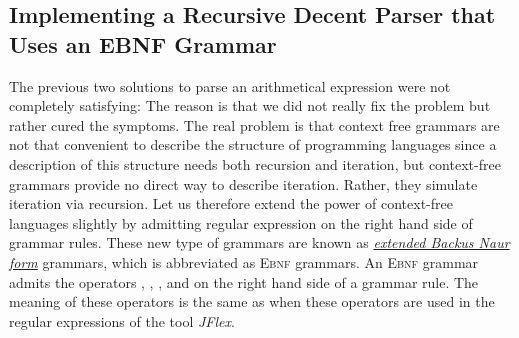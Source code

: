 
\subsection{Implementing a Recursive Decent Parser that Uses an \textsc{EBNF} Grammar}
The previous two solutions to parse an arithmetical expression were not completely
satisfying:  The reason is that we did not really fix the problem but rather cured the
symptoms.  The real problem is that context free grammars are not that convenient to
describe the structure of programming languages since a description of this structure needs both
recursion and iteration, but context-free grammars provide no direct way to describe iteration.
Rather, they simulate iteration via recursion.  Let us therefore extend the power of context-free
languages 
slightly by admitting regular expression on the right hand side of grammar rules.  
These new type of grammars are known as
\href{http://en.wikipedia.org/wiki/Extended_Backus_Naur_Form}{\emph{extended Backus Naur form}}
grammars, which 
is abbreviated as \textsc{Ebnf} grammars.  An \textsc{Ebnf} grammar admits the operators
\squoted{*}, , \squoted{+}, and \squoted{|} on the right hand side of a grammar
rule.  The meaning of these operators is the same as when these operators are used in 
the regular expressions of the tool \textsl{JFlex}.

